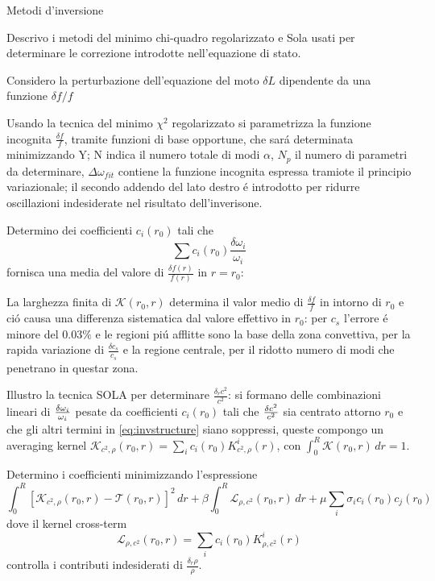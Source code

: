 \documentclass[10pt,xcolor={usenames},fleqn,mathserif,serif]{beamer}
\begin{document}
\begin{wordonframe}{Metodi d'inversione}

Descrivo i metodi del minimo chi-quadro regolarizzato e Sola usati per determinare le correzione introdotte nell'equazione di stato.

Considero la perturbazione dell'equazione del moto $\delta L$ dipendente da una funzione $\delta f/f$

Usando la tecnica del minimo $\chi^2$ regolarizzato si parametrizza la funzione incognita $\frac{\delta f}{f}$, tramite funzioni di base opportune, che sar\'a determinata minimizzando Y; N indica il numero totale di modi $\alpha$, $N_p$ il numero di parametri da determinare, $\Delta\omega_{fit}$ contiene la funzione incognita espressa tramiote il principio variazionale; il secondo addendo del lato destro \'e introdotto per ridurre oscillazioni indesiderate nel risultato dell'inverisone.


Determino dei coefficienti $c_i(r_0)$ tali che \[\sum c_i(r_0)\frac{\delta\omega_i}{\omega_i}\] fornisca una media del valore di $\frac{\delta f(r)}{f(r)}$ in $r=r_0$:

La larghezza finita di $\mathcal{K}(r_0,r)$ determina il valor medio di $\frac{\delta f}{f}$ in intorno di $r_0$ e ci\'o causa una differenza sistematica  dal valore effettivo in $r_0$: per $c_s$ l'errore \'e minore del $0.03\%$ e le regioni pi\'u afflitte sono la base della zona convettiva, per la rapida variazione di $\frac{\delta c_s}{c_s}$ e la regione centrale, per il ridotto numero di modi che penetrano in questar zona.

Illustro la tecnica SOLA per determinare $\frac{\delta_rc^2}{c^2}$: si formano delle combinazioni lineari di $\frac{\delta \omega_i}{\omega_i}$ pesate da coefficienti $c_i(r_0)$ tali che $\frac{\delta c^2}{c^2}$ sia centrato attorno $r_0$ e che gli altri termini in \eqref{eq:invstructure} siano soppressi, queste compongo un averaging kernel $\mathcal{K}_{c^2,\rho}(r_0,r)=\sum_ic_i(r_0)K_{c^2,\rho}^i(r)$, con $\int_0^R\mathcal{K}(r_0,r)\,dr=1$.


Determino i coefficienti minimizzando l'espressione
\begin{equation}
\int_0^R[\mathcal{K}_{c^2,\rho}(r_0,r)-\mathcal{T}(r_0,r)]^2\,dr+\beta\int_0^R\mathcal{L}_{\rho,c^2}(r_0,r)\,dr+\mu\sum_i\sigma_ic_i(r_0)c_j(r_0)
\end{equation}
dove il kernel cross-term
\begin{equation}
\mathcal{L}_{\rho,c^2}(r_0,r)=\sum_ic_i(r_0)K_{\rho,c^2}^i(r)
\end{equation}
controlla i contributi indesiderati di $\frac{\delta_r\rho}{\rho}$.

\end{wordonframe}

%

%

%
\end{document}
